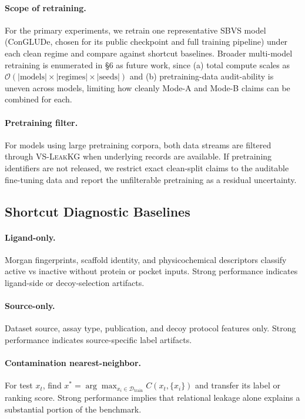 \documentclass[11pt]{article}
\begin{document}
\paragraph{Scope of retraining.}
For the primary experiments, we retrain one representative SBVS model (ConGLUDe, chosen for its public checkpoint and full training pipeline) under each clean regime and compare against shortcut baselines. Broader multi-model retraining is enumerated in §6 as future work, since (a) total compute scales as $\mathcal{O}(|\text{models}| \times |\text{regimes}| \times |\text{seeds}|)$ and (b) pretraining-data audit-ability is uneven across models, limiting how cleanly Mode-A and Mode-B claims can be combined for each.

\paragraph{Pretraining filter.}
For models using large pretraining corpora, both data streams are filtered through \textsc{VS-LeakKG} when underlying records are available. If pretraining identifiers are not released, we restrict exact clean-split claims to the auditable fine-tuning data and report the unfilterable pretraining as a residual uncertainty.

\subsection{Shortcut Diagnostic Baselines}

\paragraph{Ligand-only.} Morgan fingerprints, scaffold identity, and physicochemical descriptors classify active vs inactive without protein or pocket inputs. Strong performance indicates ligand-side or decoy-selection artifacts.

\paragraph{Source-only.} Dataset source, assay type, publication, and decoy protocol features only. Strong performance indicates source-specific label artifacts.

\paragraph{Contamination nearest-neighbor.} For test \(x_t\), find \(x^* = \arg\max_{x_i \in \mathcal{D}_{\mathrm{train}}} C(x_t, \{x_i\})\) and transfer its label or ranking score. Strong performance implies that relational leakage alone explains a substantial portion of the benchmark.
\end{document}
